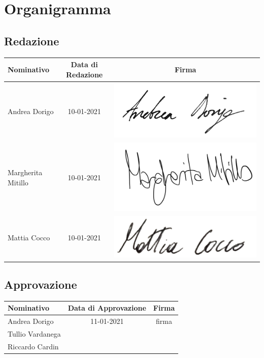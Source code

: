 \chapter{Organigramma}\label{Organigramma}

\section{Redazione}\label{7.1}
\quad
\def\tabularxcolumn#1{m{#1}}
{	
	\begin{center}
		\renewcommand{\arraystretch}{1.4}
		\begin{tabularx}{\textwidth}{|X|c|c|}
			\hline
			\rowcolor{airforceblue}
			\textbf{Nominativo} & \textbf{Data di Redazione} & \textbf{Firma}\\
			\hline
			Andrea Dorigo & 10-01-2021 & \includegraphics[width=0.2\linewidth]{../immagini/firme/firma_andrea_dorigo.png}\\
			\hline
			Margherita Mitillo & 10-01-2021 & \includegraphics[width=0.2\linewidth]{../immagini/firme/firma_margherita.png}\\
			\hline
			Mattia Cocco & 10-01-2021 &\includegraphics[width=0.2\linewidth]{../immagini/firme/firma_mattia.png}\\
			\hline
		\end{tabularx}
	\end{center}

\section{Approvazione}\label{7.2}
\quad
\def\tabularxcolumn#1{m{#1}}
{	
	\begin{center}
		\renewcommand{\arraystretch}{1.4}
		\begin{tabularx}{\textwidth}{|X|c|c|}
			\hline
			\rowcolor{airforceblue}
			\textbf{Nominativo} & \textbf{Data di Approvazione} & \textbf{Firma}\\
			\hline
			Andrea Dorigo & 11-01-2021 & firma\\
			\hline
			Tullio Vardanega & &\\
			Riccardo Cardin & &\\
			\hline
		\end{tabularx}
	\end{center}

}}
